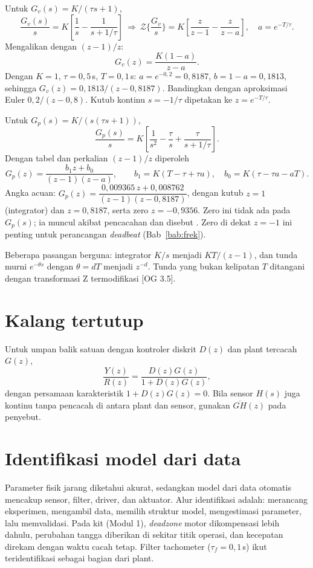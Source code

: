 \begin{contoh}
	Untuk $G_v(s) = K/(\tau s+1)$,
	\[
		\frac{G_v(s)}{s} = K\left[\frac1s - \frac{1}{s+1/\tau}\right]
		\ \Rightarrow\
		\mathcal{Z}\Big\{\frac{G_v}{s}\Big\} = K\left[\frac{z}{z-1} - \frac{z}{z-a}\right],\quad a = e^{-T/\tau}.
	\]
	Mengalikan dengan $(z-1)/z$:
	\[
		G_v(z) = \frac{K(1-a)}{z-a}.
	\]
	Dengan $K=1$, $\tau=0{,}5$\,s, $T=0{,}1$\,s: $a = e^{-0{,}2} = 0{,}8187$, $b = 1-a = 0{,}1813$, sehingga $G_v(z) = 0{,}1813/(z-0{,}8187)$. Bandingkan dengan aproksimasi Euler $0{,}2/(z-0{,}8)$. Kutub kontinu $s = -1/\tau$ dipetakan ke $z = e^{-T/\tau}$.
\end{contoh}

\begin{contoh}
	Untuk $G_p(s) = K/(s(\tau s+1))$,
	\[
		\frac{G_p(s)}{s} = K\left[\frac{1}{s^2} - \frac{\tau}{s} + \frac{\tau}{s+1/\tau}\right].
	\]
	Dengan tabel dan perkalian $(z-1)/z$ diperoleh
	\[
		G_p(z) = \frac{b_1z + b_0}{(z-1)(z-a)},\qquad b_1 = K(T - \tau + \tau a),\quad b_0 = K(\tau - \tau a - aT).
	\]
	Angka acuan: $G_p(z) = \dfrac{0{,}009365\,z + 0{,}008762}{(z-1)(z-0{,}8187)}$, dengan kutub $z = 1$ (integrator) dan $z = 0{,}8187$, serta zero $z = -0{,}9356$. Zero ini tidak ada pada $G_p(s)$; ia muncul akibat pencacahan dan disebut . Zero di dekat $z = -1$ ini penting untuk perancangan \textit{deadbeat} (Bab~\ref{bab:frek}).
\end{contoh}

Beberapa pasangan berguna: integrator $K/s$ menjadi $KT/(z-1)$, dan tunda murni $e^{-\theta s}$ dengan $\theta = dT$ menjadi $z^{-d}$. Tunda yang bukan kelipatan $T$ ditangani dengan transformasi Z termodifikasi [OG 3.5].

\section{Kalang tertutup}
Untuk umpan balik satuan dengan kontroler diskrit $D(z)$ dan plant tercacah $G(z)$,
\begin{equation}
	\frac{Y(z)}{R(z)} = \frac{D(z)G(z)}{1 + D(z)G(z)},
\end{equation}
dengan persamaan karakteristik $1 + D(z)G(z) = 0$. Bila sensor $H(s)$ juga kontinu tanpa pencacah di antara plant dan sensor, gunakan $\overline{GH}(z)$ pada penyebut.

\section{Identifikasi model dari data}
Parameter fisik jarang diketahui akurat, sedangkan model dari data otomatis mencakup sensor, filter, driver, dan aktuator. Alur identifikasi adalah: merancang eksperimen, mengambil data, memilih struktur model, mengestimasi parameter, lalu memvalidasi. Pada kit (Modul 1), \textit{deadzone} motor dikompensasi lebih dahulu, perubahan tangga diberikan di sekitar titik operasi, dan kecepatan direkam dengan waktu cacah tetap. Filter tachometer ($\tau_f = 0{,}1$\,s) ikut teridentifikasi sebagai bagian dari plant.

